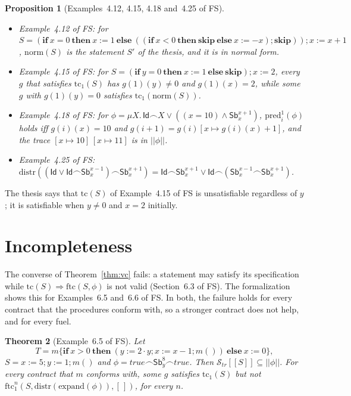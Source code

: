 \documentclass[11pt]{article}
\newcommand{\sem}[1]{[\![ #1 ]\!]}
\newcommand{\fsem}[1]{|\!|#1|\!|}
\newcommand{\Str}{{\mathcal{S}_{\mathit{tr}}}}
\newcommand{\chop}{\smallfrown}
\newcommand{\Id}{\mathsf{Id}}
\newcommand{\Sb}[2]{\mathsf{Sb}^{#1}_{#2}}
\newcommand{\kw}[1]{\mathbf{#1}}
\newcommand{\skipS}{\kw{skip}}
\newcommand{\ite}[3]{\kw{if}\ #1\ \kw{then}\ #2\ \kw{else}\ #3}
\newcommand{\call}[1]{#1()}
\newcommand{\tc}{\mathrm{tc}}
\newcommand{\ftc}{\mathrm{ftc}}
\newcommand{\pred}{\mathrm{pred}}
\newcommand{\distr}{\mathrm{distr}}
\newcommand{\norm}{\mathrm{norm}}
\newcommand{\Th}[1]{#1 of FS}
\theoremstyle{plain}
\newtheorem{theorem}{Theorem}[section]
\newtheorem{proposition}[theorem]{Proposition}
\theoremstyle{definition}
\theoremstyle{remark}
\begin{document}
\begin{proposition}[\Th{Examples~4.12, 4.15, 4.18 and~4.25}]
  \label{prop:ex-aux}\leavevmode
  \begin{itemize}
  \item \Th{Example~4.12}: for $S = (\ite{x = 0}{x := 1}{((\ite{x <
    0}{\skipS}{x := -x}); \skipS)}); x := x + 1$, $\norm(S)$ is the
    statement $S'$ of the thesis, and it is in normal form.
  \item \Th{Example~4.15}: for $S = (\ite{y = 0}{x := 1}{\skipS}); x :=
    2$, every $g$ that satisfies $\tc_1(S)$ has $g(1)(y) \neq 0$ and
    $g(1)(x) = 2$, while some $g$ with $g(1)(y) = 0$ satisfies
    $\tc_1(\norm(S))$.
  \item \Th{Example~4.18}: for $\phi = \mu X.\,\Id\chop X \lor ((x = 10)
    \land \Sb{x+1}{x})$, $\pred^1_i(\phi)$ holds iff $g(i)(x) = 10$ and
    $g(i+1) = g(i)[x \mapsto g(i)(x) + 1]$, and the trace
    $[x \mapsto 10]\,[x \mapsto 11]$ is in $\fsem{\phi}$.
  \item \Th{Example~4.25}: $\distr((\Id \lor \Id\chop\Sb{x-1}{x})\chop
    \Sb{x+1}{x}) = \Id\chop\Sb{x+1}{x} \lor
    \Id\chop(\Sb{x-1}{x}\chop\Sb{x+1}{x})$.
  \end{itemize}
\end{proposition}

The thesis says that $\tc(S)$ of \Th{Example~4.15} is unsatisfiable
regardless of $y$; it is satisfiable when $y \neq 0$ and $x = 2$
initially.

\section{Incompleteness}\label{sec:incomplete}

The converse of Theorem~\ref{thm:vc} fails: a statement may satisfy its
specification while $\tc(S) \Rightarrow \ftc(S, \phi)$ is not valid
(\Th{Section~6.3}). The formalization shows this for \Th{Examples~6.5
and~6.6}. In both, the failure holds for every contract that the
procedures conform with, so a stronger contract does not help, and for
every fuel.

\begin{theorem}[\Th{Example~6.5}]\label{thm:ex65}
  Let
  \[
    T = m\{\ite{x > 0}{(y := 2 \cdot y; x := x - 1; \call{m})}{x :=
    0}\},
  \]
  $S = x := 5; y := 1; \call{m}$ and $\phi = \mathit{true}\chop\Sb{8}{y}
  \chop\mathit{true}$. Then $\Str\sem{S} \subseteq \fsem{\phi}$. For every
  contract that $m$ conforms with, some $g$ satisfies $\tc_1(S)$ but not
  $\ftc^n_1(S, \distr(\mathrm{expand}(\phi)), [\,])$, for every $n$.
\end{theorem}
\end{document}
